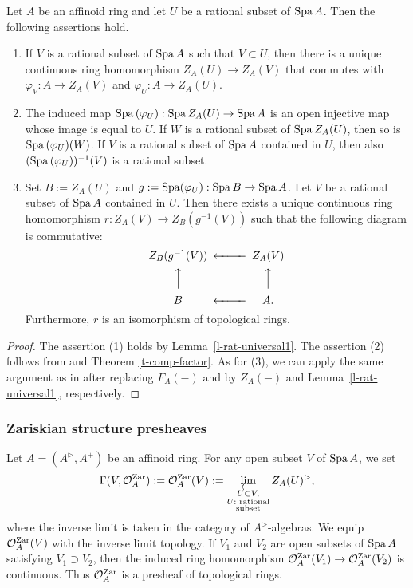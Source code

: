 \begin{lem}\label{l-rat-universal2}
Let $A$ be an affinoid ring and let $U$ be a rational subset of ${\operatorname{Spa}}\,A$. 
Then the following assertions hold. 
\begin{enumerate}
\item 
If $V$ is a rational subset of ${\operatorname{Spa}}\,A$ such that $V \subset U$, then 
there is a unique continuous ring homomorphism 
$Z_A(U) \to Z_A(V)$ that commutes with 
$\varphi_V:A \to Z_A(V)$ and $\varphi_U:A \to Z_A(U)$. 
\item 
The induced map ${\operatorname{Spa}}\,(\varphi_U):{\operatorname{Spa}}\,Z_A(U) \to {\operatorname{Spa}}\,A$ 
is an open injective map whose image is equal to $U$. 
If $W$ is a rational subset of ${\operatorname{Spa}}\,Z_A(U)$, then 
so is ${\operatorname{Spa}}\,(\varphi_U)(W)$. 
If $V$ is a rational subset of ${\operatorname{Spa}}\,A$ contained in $U$, then 
also $({\operatorname{Spa}}\,(\varphi_U))^{-1}(V)$ is a rational subset. 
\item 
Set $B:=Z_A(U)$ and $g:={\operatorname{Spa}}(\varphi_U):{\operatorname{Spa}}\,B \to {\operatorname{Spa}}\,A$. 
Let $V$ be a rational subset of ${\operatorname{Spa}}\,A$ contained in $U$. 
Then there exists a unique continuous ring homomorphism 
$r:Z_A(V) \to Z_B(g^{-1}(V))$ such that the following diagram is commutative: 
$$\begin{CD}
Z_B(g^{-1}(V)) @<<< Z_A(V)\\
@AAA @AAA\\
B @<<< A.
\end{CD}$$
Furthermore, $r$ is an isomorphism of topological rings. 
\end{enumerate}
\end{lem}

\begin{proof}
The assertion (1) holds by Lemma~\ref{l-rat-universal1}. 
The assertion (2) follows from \cite[Lemma 1.5(ii)]{Hub94} 
and Theorem \ref{t-comp-factor}. 
As for (3), 
we can apply the same argument as in \cite[Lemma 1.5(iii)]{Hub94} 
after replacing $F_A(-)$ and \cite[Lemma 1.3]{Hub94} by $Z_A(-)$ and 
Lemma~\ref{l-rat-universal1}, respectively. 
\end{proof}


\subsubsection{Zariskian structure presheaves}\label{sss-zar-str}

Let $A=(A^{\rhd}, A^+)$ be an affinoid ring. 
For any open subset $V$ of ${\operatorname{Spa}}\,A$, we set 
$$\Gamma(V, \mathcal{O}_A^{{\operatorname{Zar}}}):=\mathcal{O}_A^{{\operatorname{Zar}}}(V):=
\varprojlim_{\substack{U \subset V,\\ 
U:\text{ rational}\\ 
\text{subset}}} Z_A(U)^{\rhd},$$
where the inverse limit is taken in the category of $A^{\rhd}$-algebras. 
We equip $\mathcal{O}_A^{{\operatorname{Zar}}}(V)$ with the inverse limit topology. 
If $V_1$ and $V_2$ are open subsets of ${\operatorname{Spa}}\,A$ satisfying 
$V_1 \supset V_2$, 
then the induced ring homomorphism  $\mathcal{O}_A^{{\operatorname{Zar}}}(V_1) \to \mathcal{O}_A^{{\operatorname{Zar}}}(V_2)$ is continuous. 
Thus $\mathcal{O}^{{\operatorname{Zar}}}_A$ is a presheaf of topological rings. 

